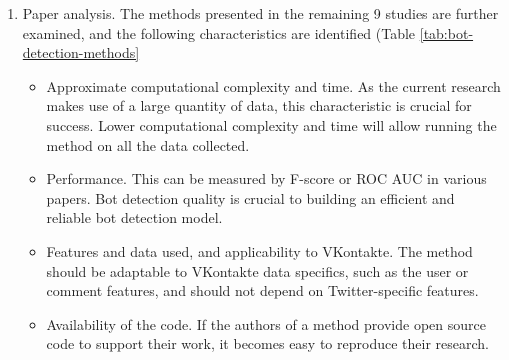 \begin{enumerate}
    \item Paper analysis. The methods presented in the remaining 9 studies are further examined, and the following characteristics are identified (Table \ref{tab:bot-detection-methods}
    \begin{itemize}
        \item Approximate computational complexity and time. As the current research makes use of a large quantity of data, this characteristic is crucial for success. Lower computational complexity and time will allow running the method on all the data collected.
        \item Performance. This can be measured by F-score or ROC AUC in various papers. Bot detection quality is crucial to building an efficient and reliable bot detection model.
        \item Features and data used, and applicability to VKontakte. The method should be adaptable to VKontakte data specifics, such as the user or comment features, and should not depend on Twitter-specific features.
        \item Availability of the code. If the authors of a method provide open source code to support their work, it becomes easy to reproduce their research.
    \end{itemize}
\end{enumerate}

